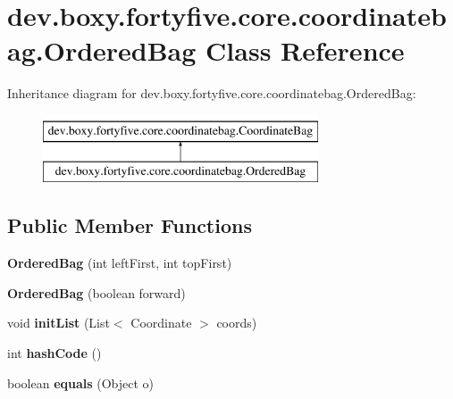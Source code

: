 \hypertarget{classdev_1_1boxy_1_1fortyfive_1_1core_1_1coordinatebag_1_1_ordered_bag}{
\section{dev.boxy.fortyfive.core.coordinatebag.OrderedBag Class Reference}
\label{d3/de4/classdev_1_1boxy_1_1fortyfive_1_1core_1_1coordinatebag_1_1_ordered_bag}
}
Inheritance diagram for dev.boxy.fortyfive.core.coordinatebag.OrderedBag:\begin{figure}[H]
\begin{center}
\leavevmode
\includegraphics[height=2.000000cm]{d3/de4/classdev_1_1boxy_1_1fortyfive_1_1core_1_1coordinatebag_1_1_ordered_bag}
\end{center}
\end{figure}
\subsection*{Public Member Functions}
\begin{DoxyCompactItemize}
\item 
\hypertarget{classdev_1_1boxy_1_1fortyfive_1_1core_1_1coordinatebag_1_1_ordered_bag_af3f4756691712c70f1c258e72d46a5ad}{
{\bfseries OrderedBag} (int leftFirst, int topFirst)}
\label{d3/de4/classdev_1_1boxy_1_1fortyfive_1_1core_1_1coordinatebag_1_1_ordered_bag_af3f4756691712c70f1c258e72d46a5ad}

\item 
\hypertarget{classdev_1_1boxy_1_1fortyfive_1_1core_1_1coordinatebag_1_1_ordered_bag_a0b965ab02499e96d5ff395967b769108}{
{\bfseries OrderedBag} (boolean forward)}
\label{d3/de4/classdev_1_1boxy_1_1fortyfive_1_1core_1_1coordinatebag_1_1_ordered_bag_a0b965ab02499e96d5ff395967b769108}

\item 
\hypertarget{classdev_1_1boxy_1_1fortyfive_1_1core_1_1coordinatebag_1_1_ordered_bag_afff314b974399fe4a34e0e1a8aacfe74}{
void {\bfseries initList} (List$<$ Coordinate $>$ coords)}
\label{d3/de4/classdev_1_1boxy_1_1fortyfive_1_1core_1_1coordinatebag_1_1_ordered_bag_afff314b974399fe4a34e0e1a8aacfe74}

\item 
\hypertarget{classdev_1_1boxy_1_1fortyfive_1_1core_1_1coordinatebag_1_1_ordered_bag_a3e7d786a466ea70ebebfe89471490d1a}{
int {\bfseries hashCode} ()}
\label{d3/de4/classdev_1_1boxy_1_1fortyfive_1_1core_1_1coordinatebag_1_1_ordered_bag_a3e7d786a466ea70ebebfe89471490d1a}

\item 
\hypertarget{classdev_1_1boxy_1_1fortyfive_1_1core_1_1coordinatebag_1_1_ordered_bag_ac8d10b859b57bf51576928a36343ca31}{
boolean {\bfseries equals} (Object o)}
\label{d3/de4/classdev_1_1boxy_1_1fortyfive_1_1core_1_1coordinatebag_1_1_ordered_bag_ac8d10b859b57bf51576928a36343ca31}

\end{DoxyCompactItemize}
